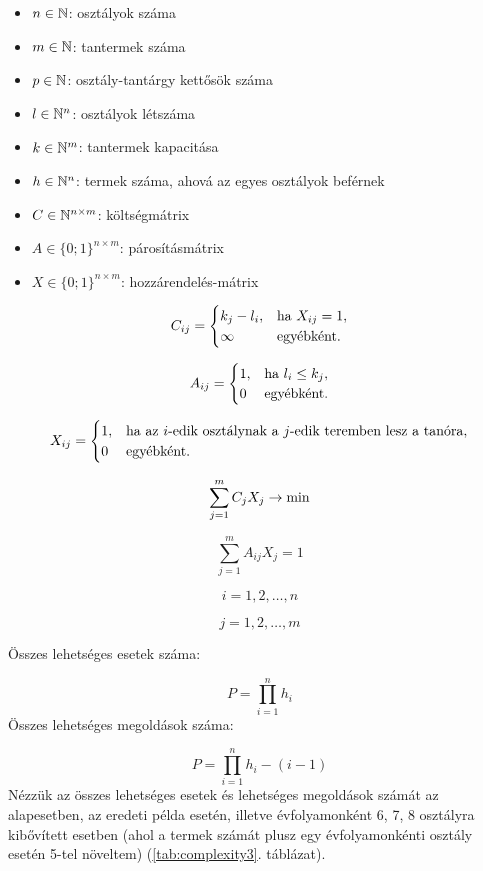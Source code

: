 
\begin{itemize}
	\item $n \in \Bbb{N}$: osztályok száma
	\item $m \in \Bbb{N}$: tantermek száma
	\item $p \in \Bbb{N}$: osztály-tantárgy kettősök száma
	\item $l \in \Bbb{N}^n$: osztályok létszáma
	\item $k \in \Bbb{N}^m$: tantermek kapacitása
	\item $h \in \Bbb{N}^n$: termek száma, ahová az egyes osztályok beférnek
	\item $C \in \Bbb{N}^{n \times m}$: költségmátrix
	\item $A \in \{0;1\}^{n \times m}$: párosításmátrix
	\item $X \in \{0;1\}^{n \times m}$: hozzárendelés-mátrix
\end{itemize}

\[
C_{ij} =
\begin{cases}
k_j-l_i, & \hbox{ha } X_{ij}=1, \\
\infty & \hbox{egyébként}.
\end{cases}
\]

\[
A_{ij} =
\begin{cases}
1, & \hbox{ha } l_i \leq k_j, \\
0& \hbox{egyébként}.
\end{cases}
\]

\[
X_{ij} =
\begin{cases}
1, & \hbox{ha az $i$-edik osztálynak a $j$-edik teremben lesz a tanóra}, \\
0&
\hbox{egyébként}.
\end{cases}
\]

$$\sum_{j=1}^m C_jX_j \rightarrow \hbox{min}$$

$$\sum_{j=1}^m A_{ij}X_j=1$$

$$i=1, 2, \ldots, n$$

$$j=1, 2, \ldots, m$$


Összes lehetséges esetek száma:

$$P=\prod_{i=1}^n h_i$$
Összes lehetséges megoldások száma:

$$P=\prod_{i=1}^n h_i-(i-1)$$
Nézzük az összes lehetséges esetek és lehetséges megoldások számát az alapesetben, az eredeti példa esetén,
illetve évfolyamonként 6, 7, 8 osztályra kibővített esetben (ahol a termek számát plusz egy évfolyamonkénti osztály
esetén 5-tel növeltem) (\ref{tab:complexity3}. táblázat).

